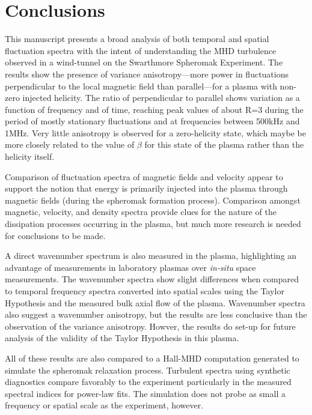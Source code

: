 \documentclass[aip,prl,amsmath,amssymb,reprint,superscriptaddress]{revtex4-1} %
\begin{document}
\section{Conclusions}\label{sec:conclusions}

This manuscript presents a broad analysis of both temporal and spatial fluctuation spectra with the intent of understanding the MHD turbulence observed in a wind-tunnel on the Swarthmore Spheromak Experiment. The results show the presence of variance anisotropy---more power in fluctuations perpendicular to the local magnetic field than parallel---for a plasma with non-zero injected helicity. The ratio of perpendicular to parallel shows variation as a function of frequency and of time, reaching peak values of about R=3 during the period of mostly stationary fluctuations and at frequencies between 500kHz and 1MHz. Very little anisotropy is observed for a zero-helicity state, which maybe be more closely related to the value of $\beta$ for this state of the plasma rather than the helicity itself.

Comparison of fluctuation spectra of magnetic fields and velocity appear to support the notion that energy is primarily injected into the plasma through magnetic fields (during the spheromak formation process). Comparison amongst magnetic, velocity, and density spectra provide clues for the nature of the dissipation processes occurring in the plasma, but much more research is needed for conclusions to be made.

A direct wavenumber spectrum is also measured in the plasma, highlighting an advantage of measurements in laboratory plasmas over {\it in-situ} space measurements. The wavenumber spectra show slight differences when compared to temporal frequency spectra converted into spatial scales using the Taylor Hypothesis and the measured bulk axial flow of the plasma. Wavenumber spectra also suggest a wavenumber anisotropy, but the results are less conclusive than the observation of the variance anisotropy. Howver, the results do set-up for future analysis of the validity of the Taylor Hypothesis in this plasma.

All of these results are also compared to a Hall-MHD computation generated to simulate the spheromak relaxation process. Turbulent spectra using synthetic diagnostics compare favorably to the experiment particularly in the measured spectral indices for power-law fits. The simulation does not probe as small a frequency or spatial scale as the experiment, however.
\end{document}
